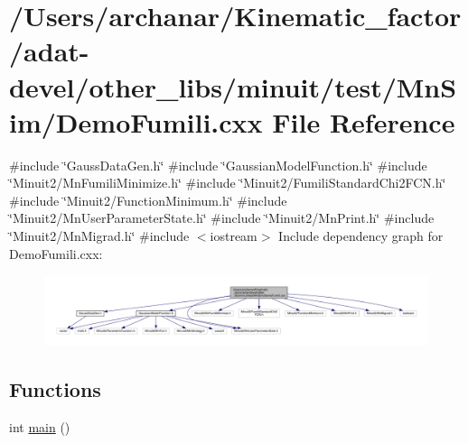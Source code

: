 \hypertarget{adat-devel_2other__libs_2minuit_2test_2MnSim_2DemoFumili_8cxx}{}\section{/\+Users/archanar/\+Kinematic\+\_\+factor/adat-\/devel/other\+\_\+libs/minuit/test/\+Mn\+Sim/\+Demo\+Fumili.cxx File Reference}
\label{adat-devel_2other__libs_2minuit_2test_2MnSim_2DemoFumili_8cxx}
{\ttfamily \#include \char`\"{}Gauss\+Data\+Gen.\+h\char`\"{}}\newline
{\ttfamily \#include \char`\"{}Gaussian\+Model\+Function.\+h\char`\"{}}\newline
{\ttfamily \#include \char`\"{}Minuit2/\+Mn\+Fumili\+Minimize.\+h\char`\"{}}\newline
{\ttfamily \#include \char`\"{}Minuit2/\+Fumili\+Standard\+Chi2\+F\+C\+N.\+h\char`\"{}}\newline
{\ttfamily \#include \char`\"{}Minuit2/\+Function\+Minimum.\+h\char`\"{}}\newline
{\ttfamily \#include \char`\"{}Minuit2/\+Mn\+User\+Parameter\+State.\+h\char`\"{}}\newline
{\ttfamily \#include \char`\"{}Minuit2/\+Mn\+Print.\+h\char`\"{}}\newline
{\ttfamily \#include \char`\"{}Minuit2/\+Mn\+Migrad.\+h\char`\"{}}\newline
{\ttfamily \#include $<$iostream$>$}\newline
Include dependency graph for Demo\+Fumili.\+cxx\+:
\nopagebreak
\begin{figure}[H]
\begin{center}
\leavevmode
\includegraphics[width=350pt]{da/d78/adat-devel_2other__libs_2minuit_2test_2MnSim_2DemoFumili_8cxx__incl}
\end{center}
\end{figure}
\subsection*{Functions}
\begin{DoxyCompactItemize}
\item 
int \mbox{\hyperlink{adat-devel_2other__libs_2minuit_2test_2MnSim_2DemoFumili_8cxx_ae66f6b31b5ad750f1fe042a706a4e3d4}{main}} ()
\end{DoxyCompactItemize}


